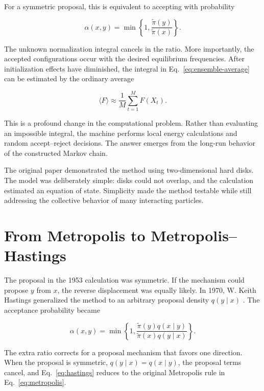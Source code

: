 \documentclass[11pt]{article}
\begin{document}
For a symmetric proposal, this is equivalent to accepting with probability

\begin{equation}
 \alpha(x,y)=\min\!\left\{1,
 \frac{\widetilde{\pi}(y)}{\widetilde{\pi}(x)}\right\}.
 \label{eq:metropolis}
\end{equation}

The unknown normalization integral cancels in the ratio. More importantly, the
accepted configurations occur with the desired equilibrium frequencies. After
initialization effects have diminished, the integral in
Eq.~\eqref{eq:ensemble-average} can be estimated by the ordinary average

\begin{equation}
 \langle F\rangle \approx \frac{1}{M}\sum_{t=1}^{M}F(X_t).
\end{equation}

This is a profound change in the computational problem. Rather than evaluating
an impossible integral, the machine performs local energy calculations and
random accept--reject decisions. The answer emerges from the long-run behavior
of the constructed Markov chain.

The original paper demonstrated the method using two-dimensional hard disks.
The model was deliberately simple: disks could not overlap, and the calculation
estimated an equation of state. Simplicity made the method testable while still
addressing the collective behavior of many interacting particles.

\section{From Metropolis to Metropolis--Hastings}

The proposal in the 1953 calculation was symmetric. If the mechanism could
propose $y$ from $x$, the reverse displacement was equally likely. In 1970,
W. Keith Hastings generalized the method to an arbitrary proposal density
$q(y\mid x)$ \cite{hastings1970}. The acceptance probability became

\begin{equation}
 \alpha(x,y)=\min\!\left\{1,
 \frac{\widetilde{\pi}(y)q(x\mid y)}
      {\widetilde{\pi}(x)q(y\mid x)}\right\}.
 \label{eq:hastings}
\end{equation}

The extra ratio corrects for a proposal mechanism that favors one direction.
When the proposal is symmetric, $q(y\mid x)=q(x\mid y)$, the proposal terms
cancel, and Eq.~\eqref{eq:hastings} reduces to the original Metropolis rule in
Eq.~\eqref{eq:metropolis}.
\end{document}
